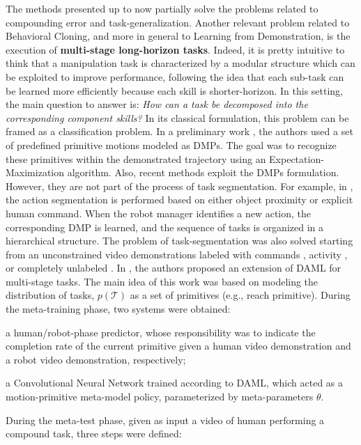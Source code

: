 The methods presented up to now partially solve the problems related to compounding error and task-generalization. Another relevant problem related to Behavioral Cloning, and more in general to Learning from Demonstration, is the execution of \textbf{multi-stage long-horizon tasks}. Indeed, it is pretty intuitive to think that a manipulation task is characterized by a modular structure which can be exploited to improve performance, following the idea that each sub-task can be learned more efficiently because each skill is shorter-horizon. In this setting, the main question to answer is: \textit{How can a task be decomposed into the corresponding component skills?} In its classical formulation, this problem can be framed as a classification problem. In a preliminary work \cite{meier2011movement_primitive}, the authors used a set of predefined primitive motions modeled as DMPs. The goal was to recognize these primitives within the demonstrated trajectory using an Expectation-Maximization algorithm. Also, recent methods \cite{caccavale2019kinesthetic,agostini2020manipulation} exploit the DMPs formulation. However, they are not part of the process of task segmentation. For example, in \cite{caccavale2019kinesthetic}, the action segmentation is performed based on either object proximity or explicit human command. When the robot manager identifies a new action, the corresponding DMP is learned, and the sequence of tasks is organized in a hierarchical structure. The problem of task-segmentation was also solved starting from an unconstrained video demonstrations labeled with commands \cite{xu2018neural_task_programming}, activity \cite{yang2015robot}, or completely unlabeled \cite{yu2018one_shot_hil,Mandlekar2020GTI}. In \cite{yu2018one_shot_hil}, the authors proposed an extension of DAML for multi-stage tasks. The main idea of this work was based on modeling the distribution of tasks, $p(\mathcal{T})$ as a set of primitives (e.g., reach primitive). During the meta-training phase, two systems were obtained: \begin{enumerate*}[label=(\textbf{\arabic*})]
    \item a human/robot-phase predictor, whose responsibility was to indicate the completion rate of the current primitive given a human video demonstration and a robot video demonstration, respectively;
    \item a Convolutional Neural Network trained according to DAML, which acted as a motion-primitive meta-model policy, parameterized by meta-parameters $\theta$.
\end{enumerate*} During the meta-test phase, given as input a video of human performing a compound task, three steps were defined: \begin{enumerate*}[label=(\textbf{\arabic*})]

\end{enumerate*}
